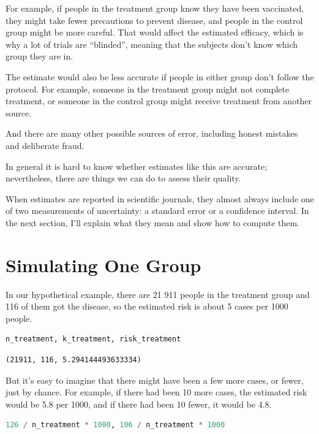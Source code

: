 For example, if people in the treatment group know they have been
vaccinated, they might take fewer precautions to prevent disease, and
people in the control group might be more careful. That would affect the
estimated efficacy, which is why a lot of trials are ``blinded'',
meaning that the subjects don't know which group they are in.

The estimate would also be less accurate if people in either group don't
follow the protocol. For example, someone in the treatment group might
not complete treatment, or someone in the control group might receive
treatment from another source.

And there are many other possible sources of error, including honest
mistakes and deliberate fraud.

In general it is hard to know whether estimates like this are accurate;
nevertheless, there are things we can do to assess their quality.

When estimates are reported in scientific journals, they almost always
include one of two measurements of uncertainty: a standard error or a
confidence interval. In the next section, I'll explain what they mean
and show how to compute them.

\hypertarget{simulating-one-group}{%
\section{Simulating One Group}\label{simulating-one-group}}

In our hypothetical example, there are 21 911 people in the treatment
group and 116 of them got the disease, so the estimated risk is about 5
cases per 1000 people.

\begin{lstlisting}[language=Python,style=source]
n_treatment, k_treatment, risk_treatment
\end{lstlisting}

\begin{lstlisting}[style=output]
(21911, 116, 5.294144493633334)
\end{lstlisting}

But it's easy to imagine that there might have been a few more cases, or
fewer, just by chance. For example, if there had been 10 more cases, the
estimated risk would be 5.8 per 1000, and if there had been 10 fewer, it
would be 4.8.

\begin{lstlisting}[language=Python,style=source]
126 / n_treatment * 1000, 106 / n_treatment * 1000
\end{lstlisting}

